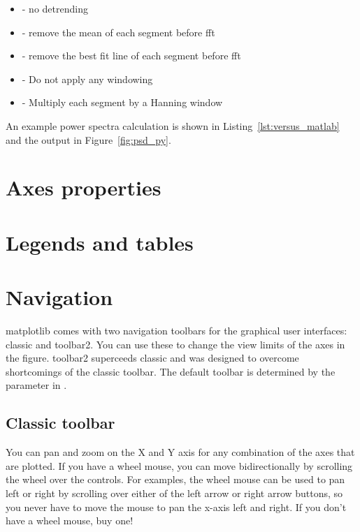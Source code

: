 \documentclass[twoside]{book}
\begin{document}
\begin{itemize}
\item {} - no detrending
\item {} - remove the mean of each segment before fft
\item {} - remove the best fit line of each segment
  before fft
\item {} - Do not apply any windowing
\item {} - Multiply each segment by a Hanning window

\end{itemize}

\noindent An example power spectra calculation is shown in
Listing~\ref{lst:versus_matlab} and the output in
Figure~\ref{fig:psd_py}.


\section{Axes properties}
\label{sec:axes_props}


\section{Legends and tables}
\label{sec:legends_and_tables}


\section{Navigation}
\label{sec:navigation}

matplotlib comes with two navigation toolbars for the graphical user
interfaces: classic and toolbar2.  You can use these to change the
view limits of the axes in the figure.  toolbar2 superceeds classic
and was designed to overcome shortcomings of the classic toolbar.  The
default toolbar is determined by the  parameter in
.

\subsection{Classic toolbar}
\label{sec:toolbar_classic}

You can pan and zoom on the X and Y axis for any combination of the
axes that are plotted.  If you have a wheel mouse, you can move
bidirectionally by scrolling the wheel over the controls.  For
examples, the wheel mouse can be used to pan left or right by
scrolling over either of the left arrow or right arrow buttons, so you
never have to move the mouse to pan the x-axis left and right.  If you
don't have a wheel mouse, buy one!
\end{document}
